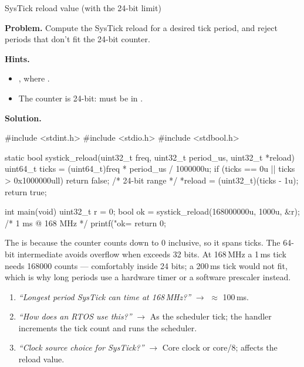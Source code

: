 \begin{gymproblem}{SysTick reload value (with the 24-bit limit)}

\textbf{Problem.} Compute the SysTick reload for a desired tick period, and
reject periods that don't fit the 24-bit counter.

\textbf{Hints.}
\begin{itemize}
\item {}, where .
\item The counter is 24-bit:  must be in .
\end{itemize}

\attempt

\textbf{Solution.}
\begin{cgym}
#include <stdint.h>
#include <stdio.h>
#include <stdbool.h>

static bool systick_reload(uint32_t freq, uint32_t period_us, uint32_t *reload) {
    uint64_t ticks = (uint64_t)freq * period_us / 1000000u;
    if (ticks == 0u || ticks > 0x1000000ull) return false;   /* 24-bit range */
    *reload = (uint32_t)(ticks - 1u);
    return true;
}

int main(void) {
    uint32_t r = 0;
    bool ok = systick_reload(168000000u, 1000u, &r);   /* 1 ms @ 168 MHz */
    printf("ok=%
    return 0;
}
\end{cgym}

The  is because the counter counts  down to 0 inclusive,
so it spans  ticks. The 64-bit intermediate avoids overflow when
 exceeds 32 bits. At 168\,MHz a 1\,ms tick needs 168000
counts --- comfortably inside 24 bits; a 200\,ms tick would not fit, which is
why long periods use a hardware timer or a software prescaler instead.

\followups
\begin{enumerate}
\item \emph{``Longest period SysTick can time at 168\,MHz?''} $\rightarrow$
   $\approx$ 100\,ms.
\item \emph{``How does an RTOS use this?''} $\rightarrow$ As the scheduler
  tick; the handler increments the tick count and runs the scheduler.
\item \emph{``Clock source choice for SysTick?''} $\rightarrow$ Core clock or
  core/8; affects the reload value.
\end{enumerate}
\end{gymproblem}


